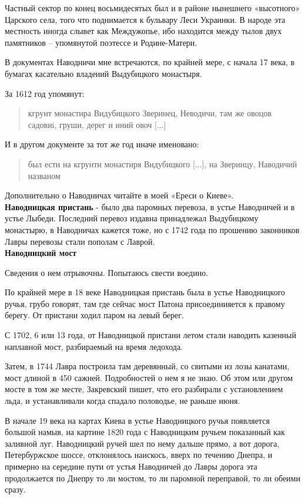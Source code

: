 Частный сектор по конец восьмидесятых был и в районе нынешнего «высотного» Царского села, того что поднимается к бульвару Леси Украинки. В народе эта местность иногда слывет как Междужопье, ибо находится между тылов двух памятников – упомянутой поэтессе и Родине-Матери.

В документах Наводничи мне встречаются, по крайней мере, с начала 17 века, в бумагах касательно владений Выдубицкого монастыря. 

За 1612 год упомянут:

\begin{quotation}
кгрунт монастира Видубицкого Зверинец, Неводичи, там же овоцов садовиi, груши, дерег и иний овоч [...]  
\end{quotation}

И в другом документе за тот же год иначе именовано:

\begin{quotation}
был ести на кгрунти монастиря Видубицкого [...], на Зверинцу, Наводичий названом\end{quotation}

Дополнительно о Наводничах читайте в моей «Ереси о Киеве».\\


\textbf{Наводницкая пристань} - было два паромных перевоза, в устье Наводничей и в устье Лыбеди. Последний перевоз издавна принадлежал Выдубицкому монастырю, в Наводничах кажется тоже, но с 1742 года по прошению законников Лавры перевозы стали пополам с Лаврой.\\


\textbf{Наводницкий мост} 

Сведения о нем отрывочны. Попытаюсь свести воедино.

По крайней мере в 18 веке Наводницкая пристань была в устье Наводницкого ручья, грубо говорят, там где сейчас мост Патона присоединияется к правому берегу. От пристани ходил паром на левый берег.

С 1702, 6 или 13 года, от Наводницкой пристани летом стали наводить казенный наплавной мост, разбираемый на время ледохода. 

Затем, в 1744 Лавра построила там деревянный, со свитыми из лозы канатами, мост длиной в 450 сажней. Подробностей о нем я не знаю. Об этом или другом мосте в том же месте, Закревский пишет, что его разбирали с установлением льда, и устанавливали когда спадало половодье, не раньше июня.

В начале 19 века на картах Киева в устье Наводницкого ручья появляется большой намыв, на картине 1820 года с Наводницким ручьем показанный как заливной луг. Наводницкий ручей шел по нему дальше прямо, а вот дорога, Петербуржское шоссе, отклонялось наискось, вверх по течению Днепра, и примерно на середине пути от устья Наводничей до Лавры дорога эта продолжается по Днепру то ли мостом, то ли паромной переправой, то ли обеими сразу.

